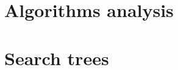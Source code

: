 \documentclass[moon, nosides, colormath]{lecturenotes}
\begin{document}
    \section{Algorithms analysis}
    

    \section{Search trees}
    
\end{document}
